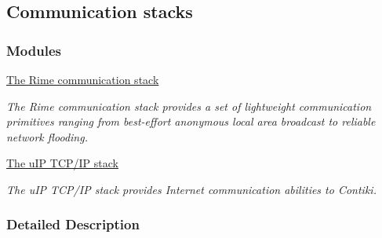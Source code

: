 \hypertarget{a00064}{}\subsection{Communication stacks}
\label{a00064}
\subsubsection*{Modules}
\begin{DoxyCompactItemize}
\item 
\hyperlink{a00068}{The Rime communication stack}
\begin{DoxyCompactList}\small\item\em The Rime communication stack provides a set of lightweight communication primitives ranging from best-\/effort anonymous local area broadcast to reliable network flooding. \end{DoxyCompactList}\item 
\hyperlink{a00074}{The u\+I\+P T\+C\+P/\+I\+P stack}
\begin{DoxyCompactList}\small\item\em The u\+IP T\+C\+P/\+IP stack provides Internet communication abilities to Contiki. \end{DoxyCompactList}\end{DoxyCompactItemize}


\subsubsection{Detailed Description}
